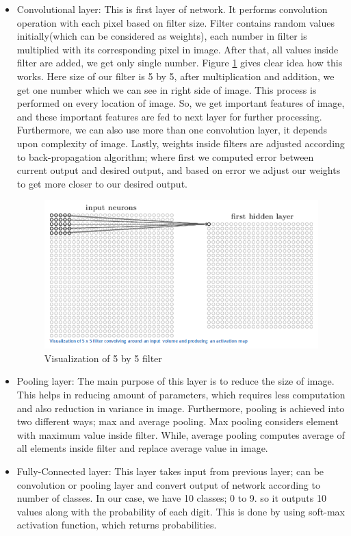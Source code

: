 \documentclass[12pt, letterpaper]{article}
\begin{document}
\begin{itemize}
	\item Convolutional layer: This is first layer of network. It performs convolution operation with each pixel based on filter size. Filter contains random values initially(which can be considered as weights), each number in filter is multiplied with its corresponding pixel in image. After that, all values inside filter are added, we get only single number. Figure \ref{features} gives clear idea how this works. Here size of our filter is 5 by 5, after multiplication and addition, we get one number which we can see in right side of image. This process is performed on every location of image. So, we get important features of image, and these important features are fed to next layer for further processing. Furthermore, we can also use more than one convolution layer, it depends upon complexity of image. Lastly, weights inside filters are adjusted according to back-propagation algorithm; where first we computed error between current output and desired output, and based on error we adjust our weights to get more closer to our desired output.
	
	\begin{figure}[!h]
		\begin{center}	
			\includegraphics[scale = 0.8]{ActivationMap.png}
			\caption{ \cite{features_map} Visualization of 5 by 5 filter } \label{features}
		\end{center}
	\end{figure}  
		
	\item Pooling layer: The main purpose of this layer is to reduce the size of image. This helps in reducing amount of parameters, which requires less computation and also reduction in variance in image. Furthermore, pooling is achieved into two different ways; max and average pooling. Max pooling considers element with maximum value inside filter. While, average pooling computes average of all elements inside filter and replace average value in image.
	\item Fully-Connected layer: This layer takes input from previous layer; can be convolution or pooling layer and convert output of network according to number of classes. In our case, we have 10 classes; 0 to 9. so it outputs 10 values along with the probability of each digit. This is done by using soft-max activation function, which returns probabilities. \cite{features_map}\cite{cnn_info}
\end{itemize}
\end{document}
